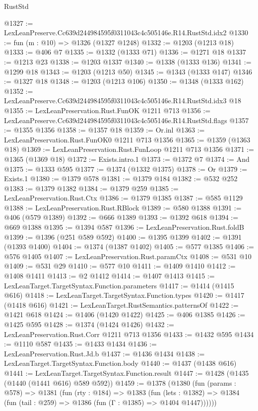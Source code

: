 \begin{lexlean}{RustStd}
\begin{coremodule}
@1327 := LexLeanPreserve.Cc639d244984595f0311043c4c505146e.R14.RustStd.idx2
@1330 := fun (m : @10) => @1326 (@1327 @1248)
@1332 := @1203 (@1213 @18)
@1333 := @406 @7
@1335 := @1332 (@1333 @71)
@1336 := @1271 @18
@1337 := @1213 @23
@1338 := @1203 @1337
@1340 := @1338 (@1333 @136)
@1341 := @1299 @18
@1343 := @1203 (@1213 @50)
@1345 := @1343 (@1333 @147)
@1346 := @1327 @18
@1348 := @1203 (@1213 @106)
@1350 := @1348 (@1333 @162)
@1352 := LexLeanPreserve.Cc639d244984595f0311043c4c505146e.R14.RustStd.idx3 @18
@1355 := LexLeanPreservation.Rust.FunOK @1211 @713
@1356 := LexLeanPreserve.Cc639d244984595f0311043c4c505146e.R14.RustStd.flags
@1357 := @1355 @1356
@1358 := @1357 @18
@1359 := Or.inl
@1363 := LexLeanPreservation.Rust.FunOK0 @1211 @713 @1356
@1365 := @1359 (@1363 @18)
@1369 := LexLeanPreservation.Rust.FunLoop @1211 @713 @1356
@1371 := @1365 (@1369 @18)
@1372 := Exists.intro.{1}
@1373 := @1372 @7
@1374 := And
@1375 := @1333 @595
@1377 := @1374 (@1332 @1375)
@1378 := Or
@1379 := Exists.{1}
@1380 := @1379 @578
@1381 := @1379 @184
@1382 := @532 @252
@1383 := @1379 @1382
@1384 := @1379 @259
@1385 := LexLeanPreservation.Rust.Ctx
@1386 := @1379 @1385
@1387 := @585 @1129
@1388 := LexLeanPreservation.Rust.RBlock
@1389 := @580 @1388
@1391 := @406 (@579 @1389)
@1392 := @666 @1389
@1393 := @1392 @618
@1394 := @669 @1388
@1395 := @1394 @587
@1396 := LexLeanPreservation.Rust.foldB
@1399 := @1396 (@251 @589 @592)
@1400 := @1395 @1399
@1402 := @1391 (@1393 @1400)
@1404 := @1374 (@1387 @1402)
@1405 := @577 @1385
@1406 := @576 @1405
@1407 := LexLeanPreservation.Rust.paramCtx
@1408 := @531 @10
@1409 := @531 @29
@1410 := @577 @10
@1411 := @1409 @1410
@1412 := @1408 @1411
@1413 := @2 @1412
@1414 := @1407 @1413
@1415 := LexLeanTarget.TargetSyntax.Function.parameters
@1417 := @1414 (@1415 @616)
@1418 := LexLeanTarget.TargetSyntax.Function.types
@1420 := @1417 (@1418 @616)
@1421 := LexLeanTarget.RustSemantics.patternsOf
@1422 := @1421 @618
@1424 := @1406 (@1420 @1422)
@1425 := @406 @1385
@1426 := @1425 @595
@1428 := @1374 (@1424 @1426)
@1432 := LexLeanPreservation.Rust.Corr @1211 @713 @1356
@1433 := @1432 @595
@1434 := @1110 @587
@1435 := @1433 @1434
@1436 := LexLeanPreservation.Rust.Jd.b
@1437 := @1436 @1434
@1438 := LexLeanTarget.TargetSyntax.Function.body
@1440 := @1437 (@1438 @616)
@1441 := LexLeanTarget.TargetSyntax.Function.result
@1447 := @1428 (@1435 (@1440 (@1441 @616) @589 @592))
@1459 := @1378
    (@1380
      (fun (params : @578) =>
      @1381
        (fun (rty : @184) =>
        @1383
          (fun (lets : @1382) =>
          @1384 (fun (tail : @259) => @1386 (fun (Γ : @1385) => @1404 @1447))))))

\end{coremodule}
\end{lexlean}
